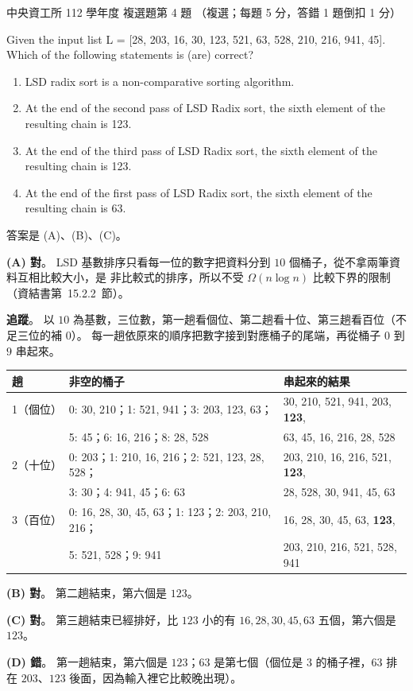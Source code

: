 \begin{pastexam}[label={px:ncu-112-dsa-04}]{中央資工所 112 學年度 複選題第 4 題}
（複選；每題 5 分，答錯 1 題倒扣 1 分）

Given the input list L = [28, 203, 16, 30, 123, 521, 63, 528, 210, 216, 941, 45]. Which of the
following statements is (are) correct?
\begin{enumerate}[label=(\Alph*)]
\item LSD radix sort is a non-comparative sorting algorithm.
\item At the end of the second pass of LSD Radix sort, the sixth element of the resulting chain is 123.
\item At the end of the third pass of LSD Radix sort, the sixth element of the resulting chain is 123.
\item At the end of the first pass of LSD Radix sort, the sixth element of the resulting chain is 63.
\end{enumerate}
\end{pastexam}

\begin{pastsoln}
答案是 (A)、(B)、(C)。

\textbf{(A) 對}。 LSD 基數排序只看每一位的數字把資料分到 $10$ 個桶子，從不拿兩筆資料互相比較大小，是
非比較式的排序，所以不受 $\Omega(n \log n)$ 比較下界的限制（資結書第~15.2.2~節）。

\textbf{追蹤}。 以 $10$ 為基數，三位數，第一趟看個位、第二趟看十位、第三趟看百位（不足三位的補 $0$）。
每一趟依原來的順序把數字接到對應桶子的尾端，再從桶子 $0$ 到 $9$ 串起來。
\begin{center}
\small
\begin{tabular}{lll}
\toprule
趟 & 非空的桶子 & 串起來的結果 \\
\midrule
1（個位） & 0: 30, 210；1: 521, 941；3: 203, 123, 63； & 30, 210, 521, 941, 203, \textbf{123}, \\
 & 5: 45；6: 16, 216；8: 28, 528 & 63, 45, 16, 216, 28, 528 \\
\midrule
2（十位） & 0: 203；1: 210, 16, 216；2: 521, 123, 28, 528； & 203, 210, 16, 216, 521, \textbf{123}, \\
 & 3: 30；4: 941, 45；6: 63 & 28, 528, 30, 941, 45, 63 \\
\midrule
3（百位） & 0: 16, 28, 30, 45, 63；1: 123；2: 203, 210, 216； & 16, 28, 30, 45, 63, \textbf{123}, \\
 & 5: 521, 528；9: 941 & 203, 210, 216, 521, 528, 941 \\
\bottomrule
\end{tabular}
\end{center}

\textbf{(B) 對}。 第二趟結束，第六個是 $123$。

\textbf{(C) 對}。 第三趟結束已經排好，比 $123$ 小的有 $16, 28, 30, 45, 63$ 五個，第六個是 $123$。

\textbf{(D) 錯}。 第一趟結束，第六個是 $123$；$63$ 是第七個（個位是 $3$ 的桶子裡，$63$ 排在 $203$、$123$
後面，因為輸入裡它比較晚出現）。
\end{pastsoln}
